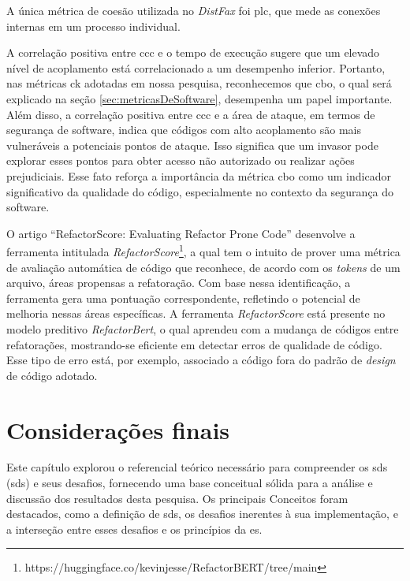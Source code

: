 A única métrica de coesão utilizada no \textit{DistFax} foi \gls{plc}, que mede as conexões internas em um processo individual.

A correlação positiva entre \gls{ccc} e o tempo de execução sugere que um elevado nível de acoplamento está correlacionado a um desempenho inferior. Portanto, nas métricas \gls{ck} adotadas em nossa pesquisa, reconhecemos que \gls{cbo}, o qual será explicado na seção \ref{sec:metricasDeSoftware}, desempenha um papel importante. Além disso, a correlação positiva entre \gls{ccc} e a área de ataque, em termos de segurança de software, indica que códigos com alto acoplamento são mais vulneráveis a potenciais pontos de ataque. Isso significa que um invasor pode explorar esses pontos para obter acesso não autorizado ou realizar ações prejudiciais. Esse fato reforça a importância da métrica \gls{cbo} como um indicador significativo da qualidade do código, especialmente no contexto da segurança do software.

O artigo ``RefactorScore: Evaluating Refactor Prone Code''\cite{KevinJesse:2023} desenvolve a ferramenta intitulada \textit{RefactorScore}\footnote{https://huggingface.co/kevinjesse/RefactorBERT/tree/main}, a qual tem o intuito de prover uma métrica de avaliação automática de código que reconhece, de acordo com os \textit{tokens} de um arquivo, áreas propensas a refatoração. Com base nessa identificação, a ferramenta gera uma pontuação correspondente, refletindo o potencial de melhoria nessas áreas específicas. A ferramenta \textit{RefactorScore} está presente no modelo preditivo \textit{RefactorBert}, o qual aprendeu com a mudança de códigos entre refatorações, mostrando-se eficiente em detectar erros de qualidade de código. Esse tipo de erro está, por exemplo, associado a código fora do padrão de \textit{design} de código adotado. 

\section{Considerações finais}
Este capítulo explorou o referencial teórico necessário para compreender os \gls{sds} (\gls{sds}) e seus desafios, fornecendo uma base conceitual sólida para a análise e discussão dos resultados desta pesquisa. Os principais Conceitos foram destacados, como a definição de \gls{sds}, os desafios inerentes à sua implementação, e a interseção entre esses desafios e os princípios da \gls{es}.

